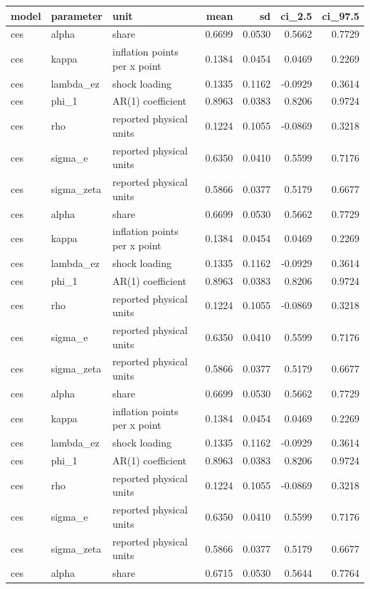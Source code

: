 \begin{tabular}{lllrrrr}
\toprule
model & parameter & unit & mean & sd & ci\_2.5 & ci\_97.5 \\
\midrule
ces & alpha & share & 0.6699 & 0.0530 & 0.5662 & 0.7729 \\
ces & kappa & inflation points per x point & 0.1384 & 0.0454 & 0.0469 & 0.2269 \\
ces & lambda\_ez & shock loading & 0.1335 & 0.1162 & -0.0929 & 0.3614 \\
ces & phi\_1 & AR(1) coefficient & 0.8963 & 0.0383 & 0.8206 & 0.9724 \\
ces & rho & reported physical units & 0.1224 & 0.1055 & -0.0869 & 0.3218 \\
ces & sigma\_e & reported physical units & 0.6350 & 0.0410 & 0.5599 & 0.7176 \\
ces & sigma\_zeta & reported physical units & 0.5866 & 0.0377 & 0.5179 & 0.6677 \\
ces & alpha & share & 0.6699 & 0.0530 & 0.5662 & 0.7729 \\
ces & kappa & inflation points per x point & 0.1384 & 0.0454 & 0.0469 & 0.2269 \\
ces & lambda\_ez & shock loading & 0.1335 & 0.1162 & -0.0929 & 0.3614 \\
ces & phi\_1 & AR(1) coefficient & 0.8963 & 0.0383 & 0.8206 & 0.9724 \\
ces & rho & reported physical units & 0.1224 & 0.1055 & -0.0869 & 0.3218 \\
ces & sigma\_e & reported physical units & 0.6350 & 0.0410 & 0.5599 & 0.7176 \\
ces & sigma\_zeta & reported physical units & 0.5866 & 0.0377 & 0.5179 & 0.6677 \\
ces & alpha & share & 0.6699 & 0.0530 & 0.5662 & 0.7729 \\
ces & kappa & inflation points per x point & 0.1384 & 0.0454 & 0.0469 & 0.2269 \\
ces & lambda\_ez & shock loading & 0.1335 & 0.1162 & -0.0929 & 0.3614 \\
ces & phi\_1 & AR(1) coefficient & 0.8963 & 0.0383 & 0.8206 & 0.9724 \\
ces & rho & reported physical units & 0.1224 & 0.1055 & -0.0869 & 0.3218 \\
ces & sigma\_e & reported physical units & 0.6350 & 0.0410 & 0.5599 & 0.7176 \\
ces & sigma\_zeta & reported physical units & 0.5866 & 0.0377 & 0.5179 & 0.6677 \\
ces & alpha & share & 0.6715 & 0.0530 & 0.5644 & 0.7764 \\

\end{tabular}
